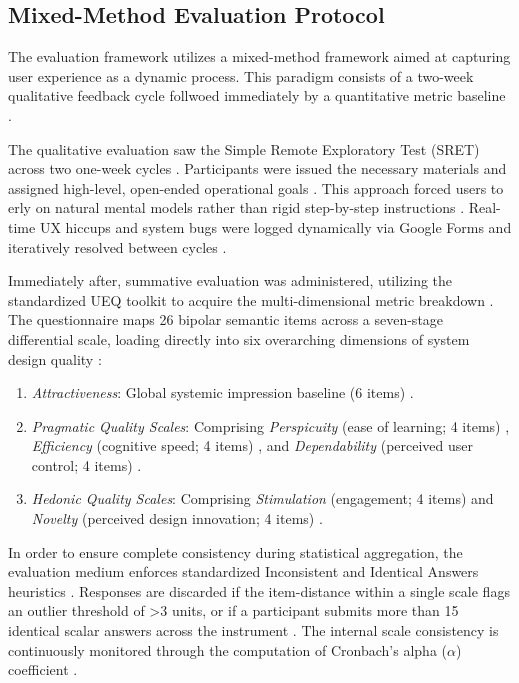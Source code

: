 \documentclass[manuscript, screen, review]{acmart}
\begin{document}
\subsection{Mixed-Method Evaluation Protocol}
\label{sub:eval_protocol}

The evaluation framework utilizes a mixed-method framework aimed at capturing user experience as a dynamic process. This paradigm consists of a two-week qualitative feedback cycle follwoed immediately by a quantitative metric baseline \cite{laugwitz_2008_construction,schrepp_2023_user}. 

The qualitative evaluation saw the Simple Remote Exploratory Test (SRET) across two one-week cycles \cite{lewis2012usability}. Participants were issued the necessary materials and assigned high-level, open-ended operational goals \cite{lewis2012usability}. This approach forced users to erly on natural mental models rather than rigid step-by-step instructions \cite{lewis2012usability}.  Real-time UX hiccups and system bugs were logged dynamically via Google Forms and iteratively resolved between cycles \cite{lewis2012usability}. 

Immediately after, summative evaluation was administered, utilizing the standardized UEQ toolkit to acquire the multi-dimensional metric breakdown \cite{laugwitz_2008_construction,hinderks_user}. The questionnaire maps 26 bipolar semantic items across a seven-stage differential scale, loading directly into six overarching dimensions of system design quality \cite{laugwitz_2008_construction,hinderks_user}: 

\begin{enumerate}
    \item \textit{Attractiveness}: Global systemic impression baseline (6 items) \cite{laugwitz_2008_construction}.
    \item \textit{Pragmatic Quality Scales}: Comprising \textit{Perspicuity} (ease of learning; 4 items) \cite{laugwitz_2008_construction}, \textit{Efficiency} (cognitive speed; 4 items) \cite{laugwitz_2008_construction}, and \textit{Dependability} (perceived user control; 4 items) \cite{laugwitz_2008_construction}.
    \item \textit{Hedonic Quality Scales}: Comprising \textit{Stimulation} (engagement; 4 items) \cite{laugwitz_2008_construction} and \textit{Novelty} (perceived design innovation; 4 items) \cite{laugwitz_2008_construction}.
\end{enumerate}

In order to ensure complete consistency during statistical aggregation, the evaluation medium enforces standardized Inconsistent and Identical Answers heuristics \cite{schrepp_2023_user}. Responses are discarded if the item-distance within a single scale flags an outlier threshold of >3 units, or if a participant submits more than 15 identical scalar answers across the instrument \cite{schrepp_2023_user}. The internal scale consistency is continuously monitored through the computation of Cronbach's alpha ($\alpha$) coefficient \cite{schrepp_2023_user}. 
\end{document}
